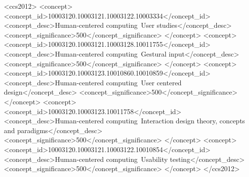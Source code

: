 \documentclass[sigconf]{acmart}
\begin{document}
%
%
\begin{CCSXML}
<ccs2012>
<concept>
<concept_id>10003120.10003121.10003122.10003334</concept_id>
<concept_desc>Human-centered computing~User studies</concept_desc>
<concept_significance>500</concept_significance>
</concept>
<concept>
<concept_id>10003120.10003121.10003128.10011755</concept_id>
<concept_desc>Human-centered computing~Gestural input</concept_desc>
<concept_significance>500</concept_significance>
</concept>
<concept>
<concept_id>10003120.10003123.10010860.10010859</concept_id>
<concept_desc>Human-centered computing~User centered design</concept_desc>
<concept_significance>500</concept_significance>
</concept>
<concept>
<concept_id>10003120.10003123.10011758</concept_id>
<concept_desc>Human-centered computing~Interaction design theory, concepts and paradigms</concept_desc>
<concept_significance>500</concept_significance>
</concept>
<concept>
<concept_id>10003120.10003121.10003122.10010854</concept_id>
<concept_desc>Human-centered computing~Usability testing</concept_desc>
<concept_significance>500</concept_significance>
</concept>
</ccs2012>
\end{CCSXML}



\maketitle






\balance
\end{document}
